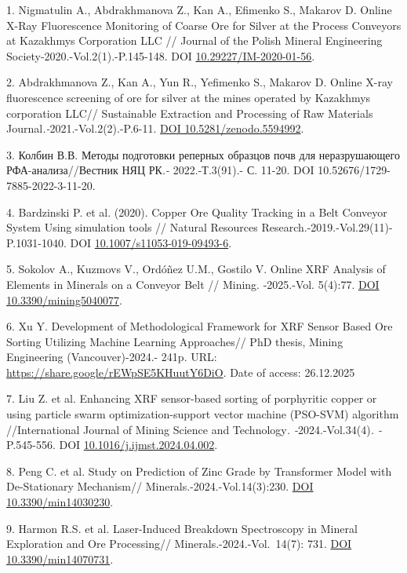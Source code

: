 \begin{refs}
1. Nigmatulin A., Abdrakhmanova Z., Kan A., Efimenko S., Makarov D.
Online X-Ray Fluorescence Monitoring of Coarse Ore for Silver at the
Process Conveyors at Kazakhmys Corporation LLC // Journal of the Polish
Mineral Engineering Society-2020.-Vol.2(1).-P.145-148. DOI
\href{http://doi.org/10.29227/IM-2020-01-56}{10.29227/IM-2020-01-56}.

2. Abdrakhmanova Z., Kan A., Yun R., Yefimenko S., Makarov D. Online
X-ray fluorescence screening of ore for silver at the mines operated by
Kazakhmys corporation LLC// Sustainable Extraction and Processing of Raw
Materials Journal\emph{.-}2021.-Vol.2(2).-P.6-11.
\href{https://doi.org/10.5281/zenodo.5594992}{DOI
10.5281/zenodo.5594992}.

3. Колбин В.В. Методы подготовки реперных образцов почв для
неразрушающего РФА-анализа//Вестник НЯЦ РК\emph{.-} 2022.-Т.3(91).- С.
11-20. DOI 10.52676/1729-7885-2022-3-11-20.

4. Bardzinski P. et al. (2020). Copper Ore Quality Tracking in a Belt
Conveyor System Using simulation tools // Natural Resources
Research.-2019.-Vol.29(11)- P.1031-1040. DOI
\href{https://doi.org/10.1007/s11053-019-09493-6?urlappend=\%3Futm_source\%3Dresearchgate.net\%26utm_medium\%3Darticle}{10.1007/s11053-019-09493-6}.

5. Sokolov A., Kuzmovs V., Ordóñez U.M., Gostilo V. Online XRF Analysis
of Elements in Minerals on a Conveyor Belt // Mining. -2025.-Vol.
5(4):77. \href{https://doi.org/10.3390/mining5040077}{DOI
10.3390/mining5040077}.

6. Xu Y. Development of Methodological Framework for XRF Sensor Based
Ore Sorting Utilizing Machine Learning Approaches// PhD thesis, Mining
Engineering (Vancouver)-2024.- 241p. URL:
\url{https://share.google/rEWpSE5KHuutY6DiO}. Date of access: 26.12.2025

7. Liu Z. et al. Enhancing XRF sensor-based sorting of porphyritic
copper or using particle swarm optimization-support vector machine
(PSO-SVM) algorithm //International Journal of Mining Science and
Technology\emph{. -}2024.-Vol.34(4)\emph{. -}P.545-556. DOI
\href{https://doi.org/10.1016/j.ijmst.2024.04.002}{10.1016/j.ijmst.2024.04.002}.

8. Peng C. et al. Study on Prediction of Zinc Grade by Transformer Model
with De-Stationary Mechanism// Minerals.-2024.-Vol.14(3):230.
\href{https://doi.org/10.3390/min14030230}{DOI 10.3390/min14030230}.

9. Harmon R.S. et al. Laser-Induced Breakdown Spectroscopy in Mineral
Exploration and Ore Processing// Minerals.-2024.-Vol.~14(7): 731.
\href{https://doi.org/10.3390/min14070731}{DOI 10.3390/min14070731}.


\end{refs}
